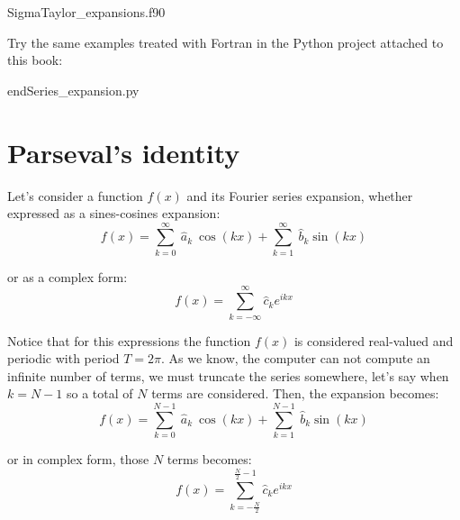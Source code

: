 {Sigma}{Taylor_expansions.f90}
  
 
    
   
   \newpage 
   Try the same examples treated with Fortran in the Python project attached to this book:
      
   \vspace{0.5cm}
   {end}{Series_expansion.py}
   \lstfor
   
   
   
   
  
  
  
  
  
   
\newpage 
\section{Parseval's identity} 

Let's consider a function $f(x)$ and its Fourier series expansion, whether expressed as a sines-cosines expansion:
\begin{equation} 
	f ( x)  =  \sum_{k=0} ^{\infty} \  \hat{a}_k  \ \cos\left(k x\right)  + \sum_{k=1} ^{\infty} \  \hat{b}_k  \sin\left(k x\right)
\end{equation} 	

or as a complex form:
\begin{equation} 
    f ( x)  =  \sum_{k=-\infty} ^{\infty}  \hat{c}_k  e^{ i k x }
\end{equation} 

Notice that for this expressions the function $f(x)$ is considered real-valued and periodic with period $T=2\pi$. As we know, the computer 
can not compute an infinite number of terms, we must truncate the series somewhere, let's say when $k = N-1$ so a total of $N$ terms are 
considered. Then, the expansion becomes:
\begin{equation} 
    f ( x)  =  \sum_{k=0} ^{N-1} \  \hat{a}_k  \ \cos\left(k x\right) + \sum_{k=1} ^{N-1} \  \hat{b}_k  \sin \left(k x\right)
\end{equation}

or in complex form, those $N$ terms becomes:
\begin{equation} 
    f ( x)  =  \sum_{k=-\frac{N}{2}} ^{\frac{N}{2}-1}  \hat{c}_k  e^{ i k x }
\end{equation} 

